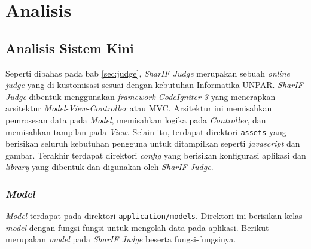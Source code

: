 \chapter{Analisis}
\label{chap:analisis}
\section{Analisis Sistem Kini}
Seperti dibahas pada bab \ref{sec:judge}, \textit{SharIF Judge} merupakan sebuah \textit{online judge} yang di kustomisasi sesuai dengan kebutuhan Informatika UNPAR. \textit{SharIF Judge} dibentuk menggunakan \textit{framework CodeIgniter 3} yang menerapkan  arsitektur \textit{Model-View-Controller} atau MVC. Arsitektur ini memisahkan pemrosesan data pada \textit{Model}, memisahkan logika pada \textit{Controller}, dan memisahkan tampilan pada \textit{View}. Selain itu, terdapat direktori \texttt{assets} yang berisikan seluruh kebutuhan pengguna untuk ditampilkan seperti \textit{javascript} dan gambar. Terakhir terdapat direktori \textit{config} yang berisikan konfigurasi aplikasi dan \textit{library} yang dibentuk dan digunakan oleh \textit{SharIF Judge}.

\subsection{\textit{Model}}
\textit{Model} terdapat pada direktori \texttt{application/models}. Direktori ini berisikan kelas \textit{model} dengan fungsi-fungsi untuk mengolah data pada aplikasi. Berikut merupakan \textit{model} pada \textit{SharIF Judge} beserta fungsi-fungsinya.
